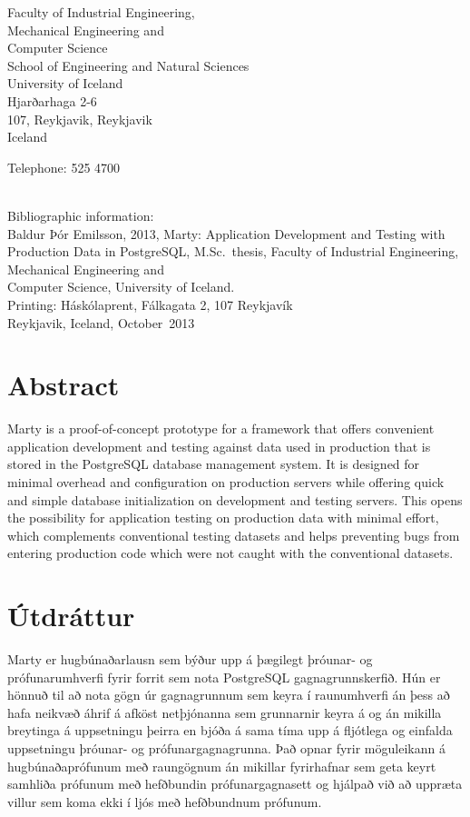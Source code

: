 \documentclass[a4paper,12pt,twoside,BCOR=10mm]{scrbook}
\def\thesisyear{2013}       						%
\def\thesismonth{October}						%
\def\thesisauthor{Baldur Þór Emilsson}					%
\def\thesistitle{Marty: Application Development and Testing with Production Data in PostgreSQL} %
\def\thesiskind{M.Sc.}							%
\def\thesisschool{School of Engineering and {Natural Sciences}}		%
\def\thesisfaculty{Industrial Engineering,\\Mechanical Engineering and\\Computer Science} %
\def\thesisaddress{Hjarðarhaga 2-6}					%
\def\thesispostalcode{107, Reykjavik}					%
\def\thesistelephone{525 4700}						%
\def\thesisPrinting{Háskólaprent, Fálkagata 2, 107 Reykjavík}
\begin{document}
\begin{titlepage}
Faculty of \thesisfaculty \\
\thesisschool \\
University of Iceland \\
\thesisaddress \\
\thesispostalcode, Reykjavik \\
Iceland

Telephone: \thesistelephone \\ \\
\vspace*{\lineskip}

Bibliographic information: \\
\thesisauthor, \thesisyear, \thesistitle, \thesiskind~thesis, Faculty of \thesisfaculty, University of Iceland. \\

Printing: \thesisPrinting \\
Reykjavik, Iceland, \thesismonth~\thesisyear \\
\newpage
\end{titlepage}



\setcounter{page}{3}
\section*{\huge Abstract}
Marty is a proof-of-concept prototype for a framework that offers convenient application development and testing against data used in production that is stored in the PostgreSQL database management system. It is designed for minimal overhead and configuration on production servers while offering quick and simple database initialization on development and testing servers. This opens the possibility for application testing on production data with minimal effort, which complements conventional testing datasets and helps preventing bugs from entering production code which were not caught with the conventional datasets.
\vfill \vspace*{1cm}
\section*{\huge Útdráttur}
Marty er hugbúnaðarlausn sem býður upp á þægilegt þróunar- og prófunarumhverfi fyrir forrit sem nota PostgreSQL gagnagrunnskerfið. Hún er hönnuð til að nota gögn úr gagnagrunnum sem keyra í raunumhverfi án þess að hafa neikvæð áhrif á afköst netþjónanna sem grunnarnir keyra á og án mikilla breytinga á uppsetningu þeirra en bjóða á sama tíma upp á fljótlega og einfalda uppsetningu þróunar- og prófunargagnagrunna. Það opnar fyrir möguleikann á hugbúnaðaprófunum með raungögnum án mikillar fyrirhafnar sem geta keyrt samhliða prófunum með hefðbundin prófunargagnasett og hjálpað við að uppræta villur sem koma ekki í ljós með hefðbundnum prófunum.
\vfill
\newpage
\end{document}
